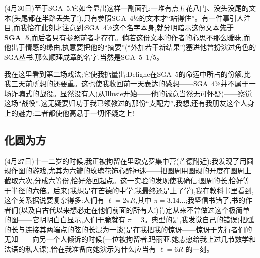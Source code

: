 (4月30日)至于SGA~5,它如今显出这样一副面孔:一堆有点五花八门、没头没尾的文本(头尾都在半路丢失了!),只有参照SGA~4½的文本才“站得住”。有一件事引人注目,而我恰在此刻才注意到:SGA~4½这个名字本身,就分明暗示这份文本\textbf{先于SGA~5},而后者只有参照前者才存在。倘若这份文本的作者\dmark{}的心思不那么暧昧,而他出于情感的缘由,执意要把他的“摘要”(“外加若干新结果”)塞进他曾扮演过角色的SGA丛书,那么顺理成章的名字,当然是SGA~5~1/5。

我在这里看到第二场戏法;它使我掂量出:Deligne在SGA~5的命运中所占的份额,比我三天前所想的还要重。这也使我收回前一天表达的感想——SGA~4½并不属于一场诈骗式的战役。显然没有人(从Illusie开始——他的诚意当然无可怀疑)——察觉这场“战役”,这无疑要归功于我已领教过的那份“支配力”,我想,还有我朋友这个人身上的魅力:二者都使他高悬于一切怀疑之上!

\subsection{化圆为方}


(4月27日)十一二岁的时候,我正被拘留在里欧克罗集中营(芒德附近);我发现了用圆规作图的游戏,尤其为六瓣的玫瑰花饰心醉神迷——把圆周用圆规的开度在圆周上截取六次,分成六等份,恰好落回起点。这一实验的发现使我确信:\dmark{}圆周的长,恰好等于半径的\textbf{六}倍。后来(我想是在芒德的中学,我最终还是上了学),我在教科书里看到,这个关系据说要复杂得多:人们有 $\ell=2\pi R$,其中 $\pi=3.14\ldots$;我坚信书错了,书的作者们(以及自古代以来想必走在他们前面的所有人!)肯定从来不曾做过这个极简单的图——它明明白白显示,人们干脆就有 $\pi=3$。典型的是,我发觉自己的错误(把弧的长与连接其两端点的弦的长混为一谈)是在我把我的惊讶——惊讶于先行者们的无知——向另一个人倾诉的时候(一位被拘留者,玛丽亚,她志愿给我上过几节数学和法语的私人课),恰在我准备向她演示为什么应当有 $\ell=6R$ 的一刻。

